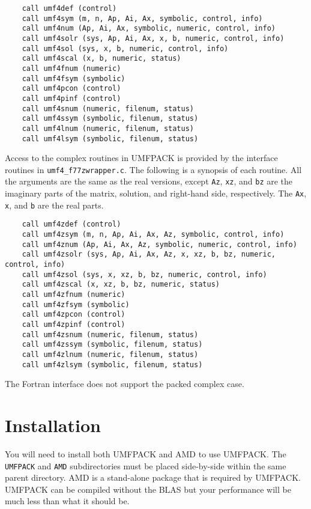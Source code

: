 \documentclass[11pt]{article}
\begin{document}
{\footnotesize
\begin{verbatim}
    call umf4def (control)
    call umf4sym (m, n, Ap, Ai, Ax, symbolic, control, info)
    call umf4num (Ap, Ai, Ax, symbolic, numeric, control, info)
    call umf4solr (sys, Ap, Ai, Ax, x, b, numeric, control, info)
    call umf4sol (sys, x, b, numeric, control, info)
    call umf4scal (x, b, numeric, status)
    call umf4fnum (numeric)
    call umf4fsym (symbolic)
    call umf4pcon (control)
    call umf4pinf (control)
    call umf4snum (numeric, filenum, status)
    call umf4ssym (symbolic, filenum, status)
    call umf4lnum (numeric, filenum, status)
    call umf4lsym (symbolic, filenum, status)
\end{verbatim}
}

Access to the complex routines in UMFPACK is provided by the interface
routines in {\tt umf4\_f77zwrapper.c}.  The following is a synopsis
of each routine.  All the arguments are the same as the real versions,
except {\tt Az}, {\tt xz}, and {\tt bz} are the imaginary parts of
the matrix, solution, and right-hand side, respectively.  The
{\tt Ax}, {\tt x}, and {\tt b} are the real parts.

{\footnotesize
\begin{verbatim}
    call umf4zdef (control)
    call umf4zsym (m, n, Ap, Ai, Ax, Az, symbolic, control, info)
    call umf4znum (Ap, Ai, Ax, Az, symbolic, numeric, control, info)
    call umf4zsolr (sys, Ap, Ai, Ax, Az, x, xz, b, bz, numeric, control, info)
    call umf4zsol (sys, x, xz, b, bz, numeric, control, info)
    call umf4zscal (x, xz, b, bz, numeric, status)
    call umf4zfnum (numeric)
    call umf4zfsym (symbolic)
    call umf4zpcon (control)
    call umf4zpinf (control)
    call umf4zsnum (numeric, filenum, status)
    call umf4zssym (symbolic, filenum, status)
    call umf4zlnum (numeric, filenum, status)
    call umf4zlsym (symbolic, filenum, status)
\end{verbatim}
}

The Fortran interface does not support the packed complex case.

\section{Installation}
\label{Install}

You will need to install both UMFPACK and AMD to use UMFPACK.
The {\tt UMFPACK} and {\tt AMD} subdirectories must be placed side-by-side
within the same parent directory.  AMD is a stand-alone package that
is required by UMFPACK.  UMFPACK can be compiled without the
BLAS
but your performance will be much less than what it should be.
\end{document}
